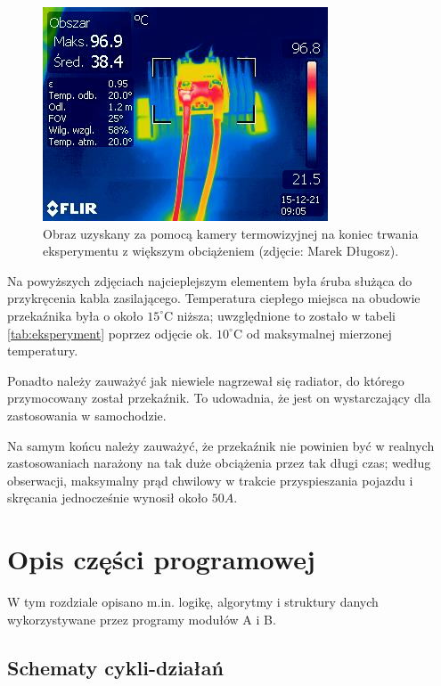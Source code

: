 \begin{figure}[H]
	\centering
	\includegraphics[scale=0.8]{flir/IR_5170.jpg}
	\caption{\label{fig:flir2}Obraz uzyskany za pomocą kamery termowizyjnej na koniec trwania eksperymentu z większym obciążeniem (zdjęcie: Marek Długosz).}
\end{figure}

Na powyższych zdjęciach najcieplejszym elementem była śruba służąca do przykręcenia kabla zasilającego. Temperatura ciepłego miejsca na obudowie przekaźnika była o około $ 15^{\circ}\mathrm{C} $ niższa; uwzględnione to zostało w tabeli \ref{tab:eksperyment} poprzez odjęcie ok. $ 10^{\circ}\mathrm{C} $ od maksymalnej mierzonej temperatury.

Ponadto należy zauważyć jak niewiele nagrzewał się radiator, do którego przymocowany został przekaźnik. To udowadnia, że jest on wystarczający dla zastosowania w samochodzie.

Na samym końcu należy zauważyć, że przekaźnik nie powinien być w realnych zastosowaniach narażony na tak duże obciążenia przez tak długi czas; według obserwacji, maksymalny prąd chwilowy w trakcie przyspieszania pojazdu i skręcania jednocześnie wynosił około $ 50A $.


\section{Opis części programowej}
\label{sec:opis_cz_programowej}

W tym rozdziale opisano m.in. logikę, algorytmy i struktury danych wykorzystywane przez programy modułów A i B.

\subsection{Schematy cykli-działań}
\label{subsec:schematy_cykli_dzialan}

